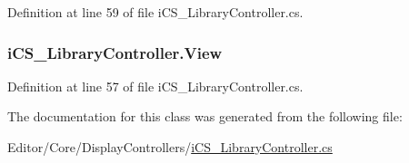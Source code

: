 Definition at line 59 of file i\+C\+S\+\_\+\+Library\+Controller.\+cs.

\hypertarget{classi_c_s___library_controller_a103a623d9e1b67daf4a6b66aaa828481}{
\subsubsection[{View}]{ i\+C\+S\+\_\+\+Library\+Controller.\+View\hspace{0.3cm}{\ttfamily [get]}}}\label{classi_c_s___library_controller_a103a623d9e1b67daf4a6b66aaa828481}


Definition at line 57 of file i\+C\+S\+\_\+\+Library\+Controller.\+cs.



The documentation for this class was generated from the following file\+:\begin{DoxyCompactItemize}
\item 
Editor/\+Core/\+Display\+Controllers/\hyperlink{i_c_s___library_controller_8cs}{i\+C\+S\+\_\+\+Library\+Controller.\+cs}\end{DoxyCompactItemize}
